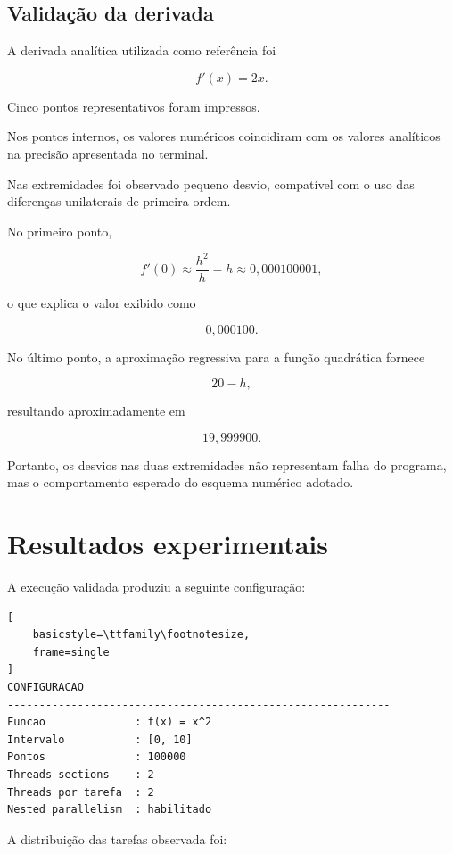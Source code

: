 \subsection{Validação da derivada}

A derivada analítica utilizada como referência foi

\[
f'(x)=2x.
\]

Cinco pontos representativos foram impressos.

Nos pontos internos, os valores numéricos coincidiram com os valores
analíticos na precisão apresentada no terminal.

Nas extremidades foi observado pequeno desvio, compatível com o uso das
diferenças unilaterais de primeira ordem.

No primeiro ponto,

\[
f'(0)
\approx
\frac{h^2}{h}
=
h
\approx
0{,}000100001,
\]

o que explica o valor exibido como

\[
0{,}000100.
\]

No último ponto, a aproximação regressiva para a função quadrática fornece

\[
20-h,
\]

resultando aproximadamente em

\[
19{,}999900.
\]

Portanto, os desvios nas duas extremidades não representam falha do programa,
mas o comportamento esperado do esquema numérico adotado.


\section{Resultados experimentais}
\label{sec:atvd08-resultados}

A execução validada produziu a seguinte configuração:

\begin{lstlisting}[
    basicstyle=\ttfamily\footnotesize,
    frame=single
]
CONFIGURACAO
------------------------------------------------------------
Funcao              : f(x) = x^2
Intervalo           : [0, 10]
Pontos              : 100000
Threads sections    : 2
Threads por tarefa  : 2
Nested parallelism  : habilitado
\end{lstlisting}

A distribuição das tarefas observada foi:

